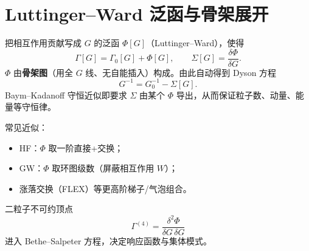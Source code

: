 \section{Luttinger--Ward 泛函与骨架展开}

把相互作用贡献写成 $G$ 的泛函 $\Phi[G]$（Luttinger--Ward），使得
\begin{equation}
  \Gamma[G]
  =\Gamma_0[G]+\Phi[G],
  \qquad
  \Sigma[G]
  =\frac{\delta\Phi}{\delta G}.
\label{eq:LW}
\end{equation}
$\Phi$ 由\textbf{骨架图}（用全 $G$ 线、无自能插入）构成。由此自动得到 Dyson 方程
\begin{equation}
  G^{-1}=G_0^{-1}-\Sigma[G].
\end{equation}
Baym--Kadanoff 守恒近似即要求 $\Sigma$ 由某个 $\Phi$ 导出，从而保证粒子数、动量、能量等守恒律。

常见近似：
\begin{itemize}
  \item HF：$\Phi$ 取一阶直接+交换；
  \item GW：$\Phi$ 取环图级数（屏蔽相互作用 $W$）；
  \item 涨落交换（FLEX）等更高阶梯子/气泡组合。
\end{itemize}

二粒子不可约顶点
\begin{equation}
  \Gamma^{(4)}
  =\frac{\delta^2\Phi}{\delta G\,\delta G}
\end{equation}
进入 Bethe--Salpeter 方程，决定响应函数与集体模式。

